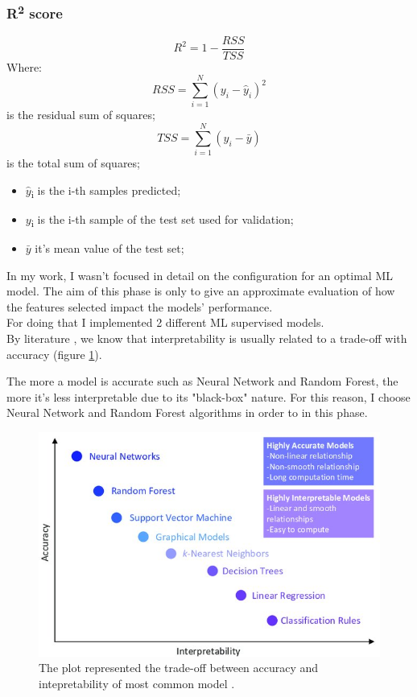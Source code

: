 \subsubsection{R\textsuperscript{2} score}
\begin{equation}
R^2 = 1 - \frac{RSS}{TSS}    
\end{equation}
Where:
\begin{equation}RSS = \sum_{i=1}^{N}(y_i-\hat{y}_i)^2 \end{equation}is the residual sum of squares;
\begin{equation} TSS =  \sum_{i=1}^{N}(y_i-\bar{y})\end{equation} is the total sum of squares;
\begin{itemize}
    \item $\hat{y}$\textsubscript{i} is the i-th samples predicted;
    \item $y$\textsubscript{i} is the i-th sample of the test set used for validation;
    \item $\bar{y}$ it's mean value of the test set;
\end{itemize}
\bigbreak\bigbreak
In my work, I wasn't focused in detail on the configuration for an optimal ML model. The aim of this phase is only to give an approximate evaluation of how the features selected impact the models' performance. \\
For doing that I implemented 2 different ML supervised models.\\
By literature \cite{morocho2019machine}, we know that interpretability is usually related to a trade-off with accuracy (figure \ref{fig:trade-off}).\par
The more a model is accurate such as Neural Network and Random Forest, the more it's less interpretable due to its "black-box" nature. 
For this reason, I choose Neural Network and Random Forest algorithms in order to in this phase.

\begin{figure}[H]
    \centering
    \includegraphics[scale=1.4]{images/interpretability_accuracy_tradeoff.jpg}
    \caption{The plot represented the trade-off between accuracy and intepretability of most common model \cite{morocho2019machine}.}
    \label{fig:trade-off}
\end{figure}

